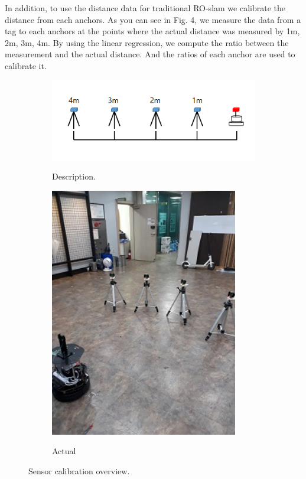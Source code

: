 \documentclass[letterpaper, 10 pt, conference]{ieeeconf}  %
\begin{document}
In addition, to use the distance data for traditional RO-slam we calibrate the distance from each anchors. As you can see in Fig. 4, we measure the data from a tag to each anchors at the points where the actual distance was measured by 1m, 2m, 3m, 4m. By using the linear regression, we compute the ratio between the measurement and the actual distance. And the ratios of each anchor are used to calibrate it.
\begin{figure}[h]
	\centering
	\begin{subfigure}[b]{.35\textwidth}
		\centering
		\includegraphics[width=.9\textwidth]{calib}
		\label{calibration:sub1} 	
		\caption{Description.}
	\end{subfigure}%
	\begin{subfigure}[b]{.15\textwidth}
		\centering
		\includegraphics[width=0.9\textwidth]{calib2}
		\label{calibration:sub2} 	
		\caption{Actual}
	\end{subfigure}
	\caption{Sensor calibration overview.}
	\label{fig:test}
\end{figure} 
\end{document}
